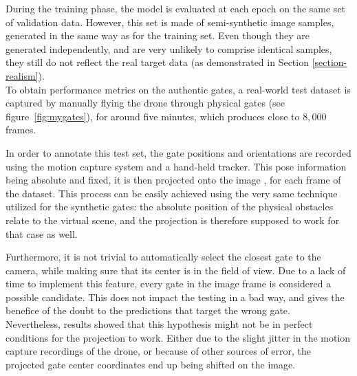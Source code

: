 During the training phase, the model is evaluated at each epoch on the same set
of validation data. However, this set is made of semi-synthetic image samples,
generated in the same way as for the training set. Even though they are
generated independently, and are very unlikely to comprise identical samples,
they still do not reflect the real target data (as demonstrated in Section
\ref{section-realism}).\\


To obtain performance metrics on the authentic gates, a real-world test dataset
is captured by manually flying the drone through physical gates (see
figure~\ref{fig:mygates}), for around five minutes, which produces close to
$8,000$ frames.

In order to annotate this test set, the gate positions and orientations are
recorded using the motion capture system and a hand-held tracker. This pose
information being absolute and fixed, it is then projected onto the image
, for each frame of the dataset. This process can be easily achieved using the
very same technique utilized for the synthetic gates: the absolute position of
the physical obstacles relate to the virtual scene, and the projection is
therefore supposed to work for that case as well.

Furthermore, it is not trivial to automatically select the closest gate to the
camera, while making sure that its center is in the field of view. Due to a
lack of time to implement this feature, every gate in the image frame is
considered a possible candidate. This does not impact the testing in a bad way,
and gives the benefice of the doubt to the predictions that target the wrong
gate.\\

Nevertheless, results showed that this hypothesis might not be in perfect
conditions for the projection to work. Either due to the slight jitter in the
motion capture recordings of the drone, or because of other sources of error,
the projected gate center coordinates end up being shifted on the image.

